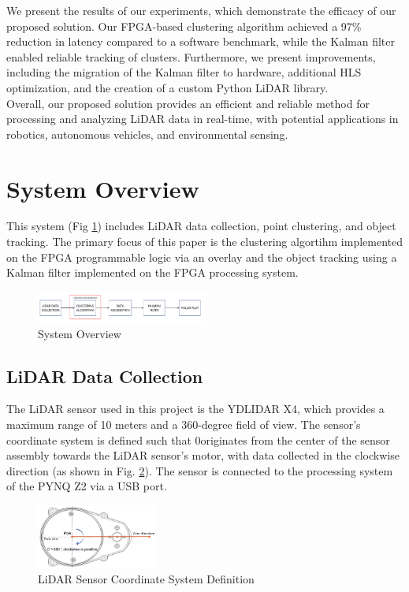 \documentclass[journal]{IEEEtran} %
\begin{document}
We present the results of our experiments, which demonstrate the efficacy of our proposed solution. Our FPGA-based clustering algorithm achieved a 97\% reduction in latency compared to a software benchmark, while the Kalman filter enabled reliable tracking of clusters. Furthermore, we present improvements, including the migration of the Kalman filter to hardware, additional HLS optimization, and the creation of a custom Python LiDAR library.\\

Overall, our proposed solution provides an efficient and reliable method for processing and analyzing LiDAR data in real-time, with potential applications in robotics, autonomous vehicles, and environmental sensing.

\section{System Overview}
This system (Fig \ref{fig:sysOverview}) includes LiDAR data collection, point clustering, and object tracking. The primary focus of this paper is the clustering algortihm implemented on the FPGA programmable logic via an overlay and the object tracking using a Kalman filter implemented on the FPGA processing system. 

\begin{figure}[h]
  \centering
  \includegraphics[width=0.5\textwidth]{sysOverview}
  \caption{System Overview}
  \label{fig:sysOverview}
\end{figure}

\subsection{LiDAR Data Collection}

The LiDAR sensor used in this project is the YDLIDAR X4, which provides a maximum range of 10 meters and a 360-degree field of view. The sensor's coordinate system is defined such that 0\textdegree originates from the center of the sensor assembly towards the LiDAR sensor's motor, with data collected in the clockwise direction (as shown in Fig. \ref{fig:polarLiDAR}). The sensor is connected to the processing system of the PYNQ Z2 via a USB port.

\begin{figure}[h]
  \centering
  \includegraphics[width=0.35\textwidth]{polarLiDAR}
  \caption{LiDAR Sensor Coordinate System Definition}
  \label{fig:polarLiDAR}
\end{figure}
\end{document}
